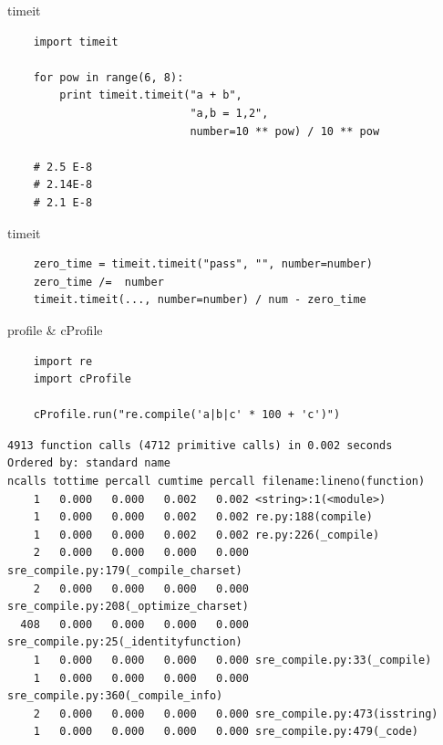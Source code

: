 \documentclass{article}
\begin{document}
\begin{center} timeit \end{center}
\begin{lstlisting}
    import timeit
    
    for pow in range(6, 8):
        print timeit.timeit("a + b", 
                            "a,b = 1,2", 
                            number=10 ** pow) / 10 ** pow

    # 2.5 E-8
    # 2.14E-8
    # 2.1 E-8
\end{lstlisting}
\newpage

\begin{center} timeit \end{center}
\begin{lstlisting}
    zero_time = timeit.timeit("pass", "", number=number)
    zero_time /=  number
    timeit.timeit(..., number=number) / num - zero_time
\end{lstlisting}
\newpage

\begin{center} profile \& cProfile \end{center}
\begin{lstlisting}
    import re
    import cProfile

    cProfile.run("re.compile('a|b|c' * 100 + 'c')")
\end{lstlisting}
\large
\begin{verbatim}
4913 function calls (4712 primitive calls) in 0.002 seconds
Ordered by: standard name
ncalls tottime percall cumtime percall filename:lineno(function)
    1   0.000   0.000   0.002   0.002 <string>:1(<module>)
    1   0.000   0.000   0.002   0.002 re.py:188(compile)
    1   0.000   0.000   0.002   0.002 re.py:226(_compile)
    2   0.000   0.000   0.000   0.000 sre_compile.py:179(_compile_charset)
    2   0.000   0.000   0.000   0.000 sre_compile.py:208(_optimize_charset)
  408   0.000   0.000   0.000   0.000 sre_compile.py:25(_identityfunction)
    1   0.000   0.000   0.000   0.000 sre_compile.py:33(_compile)
    1   0.000   0.000   0.000   0.000 sre_compile.py:360(_compile_info)
    2   0.000   0.000   0.000   0.000 sre_compile.py:473(isstring)
    1   0.000   0.000   0.000   0.000 sre_compile.py:479(_code)
\end{verbatim}
\LARGE
\newpage
\end{document}
